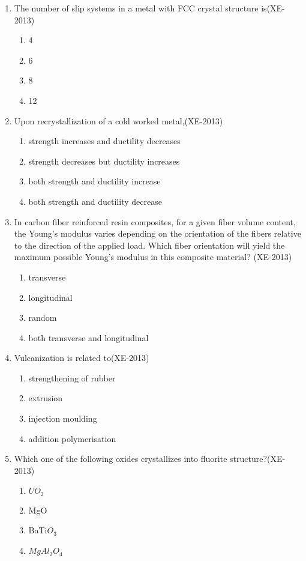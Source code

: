 \documentclass[journal]{IEEEtran}
\numberwithin{equation}{enumi}
\numberwithin{figure}{enumi}
\begin{document}
\begin{enumerate}
\begin{enumerate}
\end{enumerate}
\item The number of slip systems in a metal with FCC crystal structure is\hfill(XE-2013)
\begin{enumerate}
    \item 4
    \item 6
    \item 8
    \item 12
\end{enumerate}
\item Upon recrystallization of a cold worked metal,\hfill(XE-2013)
\begin{enumerate}
    \item strength increases and ductility decreases
    \item strength decreases but ductility increases
    \item both strength and ductility increase
    \item both strength and ductility decrease
\end{enumerate}
\item In carbon fiber reinforced resin composites, for a given fiber volume content, the Young's modulus varies depending on the orientation of the fibers relative to the direction of the applied load. Which fiber orientation will yield the maximum possible Young's modulus in this composite material?
\hfill(XE-2013)
\begin{enumerate}
    \item transverse 
    \item longitudinal
    \item random 
    \item both transverse and longitudinal
\end{enumerate}
\item Vulcanization is related to\hfill(XE-2013)
\begin{enumerate}
    \item strengthening of rubber 
    \item extrusion
    \item injection moulding 
    \item addition polymerisation
\end{enumerate}
\item Which one of the following oxides crystallizes into fluorite structure?\hfill(XE-2013)
\begin{enumerate}
    \item $UO_2$
    \item MgO
    \item BaTi$O_3$
    \item $MgAl_2O_4$
\end{enumerate}
\end{enumerate}
\end{document}
